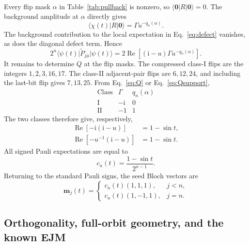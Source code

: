 \documentclass[11pt,a4paper]{article}
\numberwithin{equation}{section}
\theoremstyle{definition}
\newcommand{\ii}{\mathrm i}
\newcommand{\ket}[1]{\lvert#1\rangle}
\newcommand{\bra}[1]{\langle#1\rvert}
\newcommand{\zero}{\bm 0}
\begin{document}
Every flip mask $\alpha$ in Table~\ref{tab:pullback} is nonzero, so $\bra{\zero}R\ket{\zero}=0$. The background amplitude at $\alpha$ directly gives
\begin{equation}
 \bra{\chi(t)}R\ket{\zero}=\Gamma u^{-q_n(\alpha)}.
\end{equation}
The background contribution to the local expectation in Eq.~\eqref{eq:defect} vanishes, as does the diagonal defect term. Hence
\begin{equation}
 2^n\bra{\psi(t)}\widetilde P_{j\mu}\ket{\psi(t)}
 =2\operatorname{Re}\left[(\ii-u)\Gamma u^{-q_n(\alpha)}\right].
 \label{eq:cross}
\end{equation}
It remains to determine $Q$ at the flip masks. The compressed class-I flips are the integers $1,2,3,16,17$. The class-II adjacent-pair flips are $6,12,24$, and including the last-bit flip gives $7,13,25$. From Eq.~\eqref{eq:Q} or Eq.~\eqref{eq:Qsupport},
\begin{equation}
 \begin{array}{c|c|c}
 \text{Class}&\Gamma&q_n(\alpha)\\\hline
 \mathrm I&-\ii&0\\
 \mathrm {II}&-1&1
 \end{array}
\end{equation}
The two classes therefore give, respectively,
\begin{align}
 \operatorname{Re}[-\ii(\ii-u)]&=1-\sin t,\\
 \operatorname{Re}[-u^{-1}(\ii-u)]&=1-\sin t.
\end{align}
All signed Pauli expectations are equal to
\begin{equation}
 c_n(t)=\frac{1-\sin t}{2^{n-1}}.
 \label{eq:cn}
\end{equation}
Returning to the standard Pauli signs, the seed Bloch vectors are
\begin{equation}
 \bm m_j(t)=
 \begin{cases}
 c_n(t)(1,1,1),&j<n,\\
 c_n(t)(1,-1,1),&j=n.
 \end{cases}
 \label{eq:seed-bloch}
\end{equation}

\subsection{Orthogonality, full-orbit geometry, and the known EJM}
\end{document}
